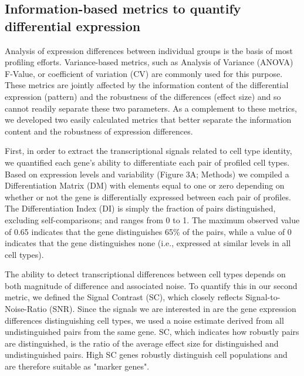 \subsection{Information-based metrics to quantify differential expression}

Analysis of expression differences between individual groups is the basis of most profiling efforts. Variance-based metrics, such as Analysis of Variance (ANOVA) F-Value, or coefficient of variation (CV) are commonly used for this purpose. These metrics are jointly affected by the information content of the differential expression (pattern) and the robustness of the differences (effect size) and so cannot readily separate these two parameters. As a complement to these metrics, we developed two easily calculated metrics that better separate the information content and the robustness of expression differences. 

First, in order to extract the transcriptional signals related to cell type identity, we quantified each gene's ability to differentiate each pair of profiled cell types. Based on expression levels and variability (Figure 3A; Methods) we compiled a Differentiation Matrix (DM) with elements equal to one or zero depending on whether or not the gene is differentially expressed between each pair of profiles. The Differentiation Index (DI) is simply the fraction of pairs distinguished, excluding self-comparisons; and ranges from 0 to 1. The maximum observed value of 0.65 indicates that the gene distinguishes 65\% of the pairs, while a value of 0 indicates that the gene distinguishes none (i.e., expressed at similar levels in all cell types).

The ability to detect transcriptional differences between cell types depends on both magnitude of difference and associated noise. To quantify this in our second metric, we defined the Signal Contrast (SC), which closely reflects Signal-to-Noise-Ratio (SNR). Since the signals we are interested in are the gene expression differences distinguishing cell types, we used a noise estimate derived from all undistinguished pairs from the same gene. SC, which indicates how robustly pairs are distinguished, is the ratio of the average effect size for distinguished and undistinguished pairs. High SC genes robustly distinguish cell populations and are therefore suitable as "marker genes". 

